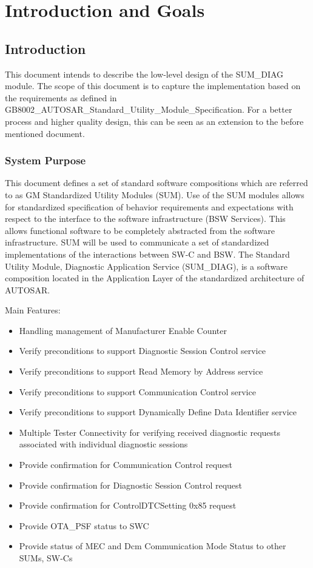 \chapter{Introduction and Goals}

\section{Introduction}

This document intends to describe the low-level design of the SUM_DIAG module.  The scope of this document is to capture the implementation based on the requirements as defined in 
GB8002_AUTOSAR_Standard_Utility_Module_Specification.  For a better process and higher quality design, this can be seen as an extension to the before mentioned document. 

\subsection{System Purpose}

This document defines a set of standard software compositions which are referred to as GM Standardized Utility Modules (SUM). 
Use of the SUM modules allows for standardized specification of behavior requirements and expectations with respect to the interface to the software infrastructure (BSW Services). This allows functional software to be completely abstracted from 
the software infrastructure. SUM will be used to communicate a set of standardized implementations of the interactions between SW-C and BSW.
The Standard Utility Module, Diagnostic Application Service (SUM_DIAG), is a software composition located in the Application Layer of the standardized architecture of AUTOSAR.

Main Features:
\begin{itemize}
	\item Handling management of Manufacturer Enable Counter
	\item Verify preconditions to support Diagnostic Session Control service
	\item Verify preconditions to support Read Memory by Address service
	\item Verify preconditions to support Communication Control service
	\item Verify preconditions to support Dynamically Define Data Identifier service
	\item Multiple Tester Connectivity for verifying received diagnostic requests associated with individual diagnostic sessions
	\item Provide confirmation for Communication Control request
	\item Provide confirmation for Diagnostic Session Control request
	\item Provide confirmation for ControlDTCSetting 0x85 request
	\item Provide OTA_PSF status to SWC
	\item Provide status of MEC and Dcm Communication Mode Status to other SUMs, SW-Cs
\end{itemize}

